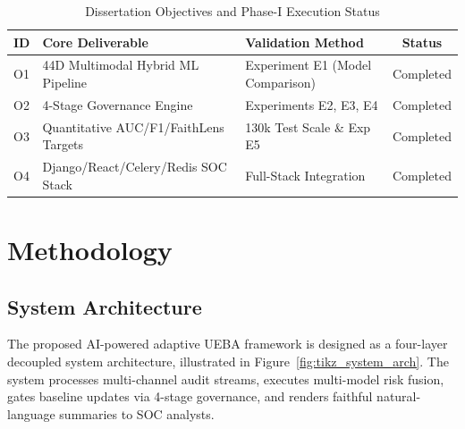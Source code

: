\documentclass[12pt,a4paper]{report}
\begin{document}
\begin{table}[htbp]
\caption{Dissertation Objectives and Phase-I Execution Status}
\label{tab:objective_status}
\centering
\small
\begin{tabularx}{\textwidth}{l X l c}
\toprule
\textbf{ID} & \textbf{Core Deliverable} & \textbf{Validation Method} & \textbf{Status} \\
\midrule
O1 & 44D Multimodal Hybrid ML Pipeline & Experiment E1 (Model Comparison) & Completed \\
O2 & 4-Stage Governance Engine & Experiments E2, E3, E4 & Completed \\
O3 & Quantitative AUC/F1/FaithLens Targets & 130k Test Scale \& Exp E5 & Completed \\
O4 & Django/React/Celery/Redis SOC Stack & Full-Stack Integration & Completed \\
\bottomrule
\end{tabularx}
\end{table}

\chapter{Methodology}
\label{chap:methodology}

\section{System Architecture}
\label{sec:sys_arch}

The proposed AI-powered adaptive UEBA framework is designed as a four-layer decoupled system architecture, illustrated in Figure~\ref{fig:tikz_system_arch}. The system processes multi-channel audit streams, executes multi-model risk fusion, gates baseline updates via 4-stage governance, and renders faithful natural-language summaries to SOC analysts.
\end{document}
